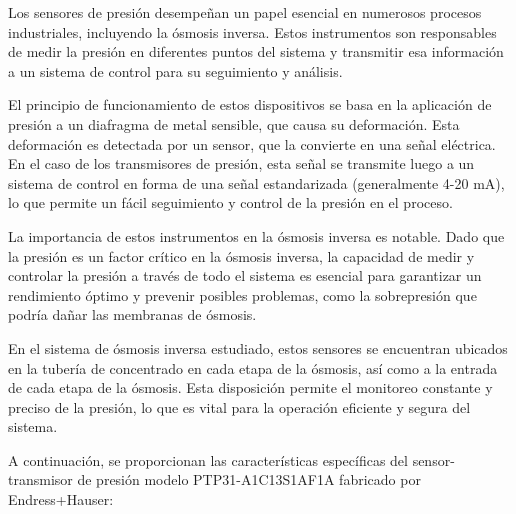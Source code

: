Los sensores de presión desempeñan un papel esencial en numerosos procesos industriales,
incluyendo la ósmosis inversa. Estos instrumentos son responsables de medir la presión en diferentes puntos
del sistema y transmitir esa información a un sistema de control para su seguimiento y análisis.

El principio de funcionamiento de estos dispositivos se basa en la aplicación de presión a un diafragma de
metal sensible, que causa su deformación. Esta deformación es detectada por un sensor, que la convierte en
una señal eléctrica. En el caso de los transmisores de presión, esta señal se transmite luego a un sistema de control en forma
de una señal estandarizada (generalmente 4-20 mA), lo que permite un fácil seguimiento y control de la presión en el proceso.

La importancia de estos instrumentos en la ósmosis inversa es notable. Dado que la presión es un factor
crítico en la ósmosis inversa, la capacidad de medir y controlar la presión a través de todo el sistema
es esencial para garantizar un rendimiento óptimo y prevenir posibles problemas, como la sobrepresión
que podría dañar las membranas de ósmosis.

En el sistema de ósmosis inversa estudiado, estos sensores se encuentran
ubicados en la tubería de concentrado en cada etapa de la ósmosis, así como a la entrada de cada etapa
de la ósmosis. Esta disposición permite el monitoreo constante y preciso de la presión, lo que es
vital para la operación eficiente y segura del sistema.

A continuación, se proporcionan las características específicas del sensor-transmisor de presión
modelo PTP31-A1C13S1AF1A fabricado por Endress+Hauser:\\



